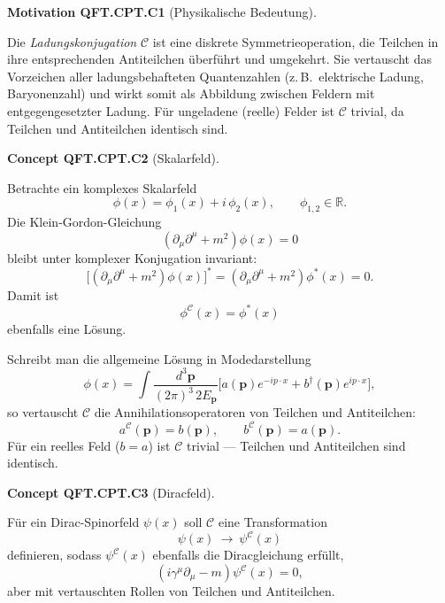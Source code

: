 \documentclass[10pt, letterpaper]{article}
\newcommand{\CustomHeading}[3]{%
  \par\medskip\noindent%
  \textbf{#1 #2} \textnormal{(#3)}.\enskip%
}
\newenvironment{CONC}[2]{\begin{unitbox}\CustomHeading{Concept}{#1}{#2}}{\end{unitbox}}
\newenvironment{MOT}[2]{\begin{unitbox}\CustomHeading{Motivation}{#1}{#2}}{\end{unitbox}}
\begin{document}
\begin{MOT}{QFT.CPT.C1}{Physikalische Bedeutung}
Die \emph{Ladungskonjugation} $\mathcal C$ ist eine diskrete Symmetrieoperation, die Teilchen in ihre entsprechenden Antiteilchen überführt und umgekehrt.  
Sie vertauscht das Vorzeichen aller ladungsbehafteten Quantenzahlen (z.\,B.\ elektrische Ladung, Baryonenzahl) und wirkt somit als Abbildung zwischen Feldern mit entgegengesetzter Ladung.  
Für ungeladene (reelle) Felder ist $\mathcal C$ trivial, da Teilchen und Antiteilchen identisch sind.
\end{MOT}

\begin{CONC}{QFT.CPT.C2}{Skalarfeld}
Betrachte ein komplexes Skalarfeld
\[
\phi(x)=\phi_1(x)+i\,\phi_2(x), \qquad \phi_{1,2}\in\mathbb R.
\]
Die Klein-Gordon-Gleichung
\[
(\partial_\mu\partial^\mu+m^2)\phi(x)=0
\]
bleibt unter komplexer Konjugation invariant:
\[
\bigl[(\partial_\mu\partial^\mu+m^2)\phi(x)\bigr]^*
=(\partial_\mu\partial^\mu+m^2)\phi^*(x)=0.
\]
Damit ist
\[
\boxed{\ \phi^{\mathcal C}(x)=\phi^*(x)\ }
\]
ebenfalls eine Lösung.  

Schreibt man die allgemeine Lösung in Modedarstellung
\[
\phi(x)=\!\int\!\frac{d^3\mathbf p}{(2\pi)^3\,2E_{\mathbf p}}
\big[a(\mathbf p)e^{-ip\cdot x}+b^\dagger(\mathbf p)e^{ip\cdot x}\big],
\]
so vertauscht $\mathcal C$ die Annihilationsoperatoren von Teilchen und Antiteilchen:
\[
a^{\mathcal C}(\mathbf p)=b(\mathbf p),\qquad b^{\mathcal C}(\mathbf p)=a(\mathbf p).
\]
Für ein reelles Feld ($b=a$) ist $\mathcal C$ trivial — Teilchen und Antiteilchen sind identisch.
\end{CONC}

\begin{CONC}{QFT.CPT.C3}{Diracfeld}
Für ein Dirac-Spinorfeld $\psi(x)$ soll $\mathcal C$ eine Transformation
\[
\psi(x)\ \longrightarrow\ \psi^{\mathcal C}(x)
\]
definieren, sodass $\psi^{\mathcal C}(x)$ ebenfalls die Diracgleichung erfüllt,
\[
(i\gamma^\mu\partial_\mu-m)\psi^{\mathcal C}(x)=0,
\]
aber mit vertauschten Rollen von Teilchen und Antiteilchen.
\end{CONC}
\end{document}

